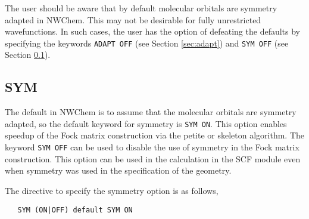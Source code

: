 



The user should be aware that by default molecular orbitals are symmetry 
adapted in NWChem.  This may not be desirable for fully unrestricted 
wavefunctions.  In such cases, the user has the option of defeating the
defaults by specifying the keywords \verb+ADAPT OFF+ (see Section 
\ref{sec:adapt}) and \verb+SYM OFF+ (see Section \ref{sec:sym}).

\subsection{SYM}
\label{sec:sym}

The default in NWChem is to assume that the molecular orbitals are 
symmetry adapted, so the default keyword for symmetry is \verb+SYM ON+.
This option enables speedup of the Fock matrix construction via the
petite or skeleton algorithm.  The keyword \verb+SYM OFF+ can be used to
%
disable the use of symmetry in the Fock matrix construction.  This
option can be used in the calculation in the SCF module even when
symmetry was used in the specification of the geometry.

The directive to specify the symmetry option is as follows,

 \begin{verbatim}
   SYM (ON|OFF) default SYM ON
 \end{verbatim}



